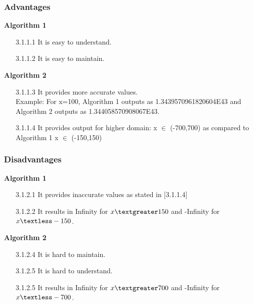 \documentclass{article}
\begin{document}
\subsubsection{Advantages}
\vspace{1mm}
\textbf{Algorithm 1}
\begin{itemize}
\item [3.1.1.1]It is easy to understand.
\item [3.1.1.2]It is easy to maintain.
\end{itemize}
\vspace{1mm}
\textbf{Algorithm 2}
\begin{itemize}
\item [3.1.1.3]It provides more accurate values.\\Example: For x=100, Algorithm 1 outputs as 1.3439570961820604E43 and Algorithm 2 outputs as 1.344058570908067E43.
\item [3.1.1.4]It provides output for higher domain: x $\in$ (-700,700) as compared to Algorithm 1 x $\in$ (-150,150)
\end{itemize}
\subsubsection{Disadvantages}
\textbf{Algorithm 1}
\begin{itemize}
\item [3.1.2.1]It provides inaccurate values as stated in [3.1.1.4]
\item [3.1.2.2]It results in Infinity for $x\textgreater 150$ and -Infinity for $x\textless -150$.
\end{itemize}
\vspace{1mm}
\textbf{Algorithm 2}
\begin{itemize}
\item [3.1.2.4]It is hard to maintain.
\item [3.1.2.5]It is hard to understand.
\item [3.1.2.5]It results in Infinity for $x\textgreater 700$ and -Infinity for $x\textless -700$.
\end{itemize}
\pagebreak
\end{document}
